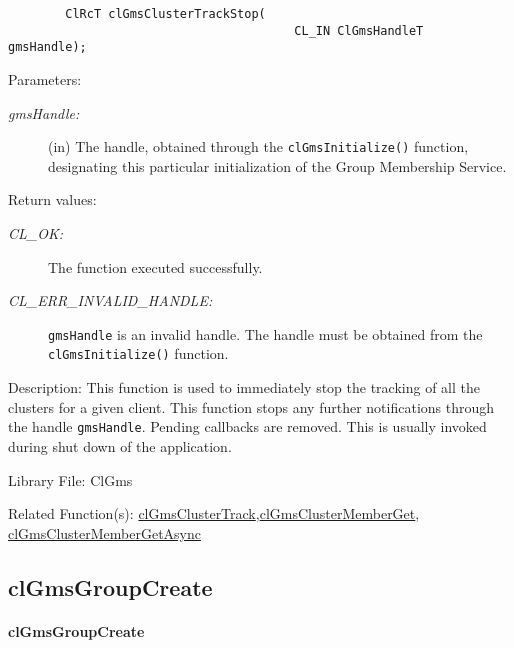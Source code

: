 \begin{flushleft}
\begin{Desc}
\footnotesize\begin{verbatim}        ClRcT clGmsClusterTrackStop(
                                		CL_IN ClGmsHandleT              gmsHandle);
\end{verbatim}
\normalsize
\end{Desc}
\begin{Desc}
\item[Parameters:]
\begin{description}
\item[{\em gms\-Handle:}](in) The handle, obtained through the {\tt{clGmsInitialize()}} function, designating this particular initialization of the
Group Membership Service.\end{description}
\end{Desc}
\begin{Desc}
\item[Return values:]
\begin{description}
\item[{\em CL\_\-OK:}]The function executed successfully. \item[{\em CL\_\-ERR\_\-INVALID\_\-HANDLE:}]{\tt{gmsHandle}} is an invalid handle. The handle
must be obtained from the
{\tt{clGmsInitialize()}} function. \end{description}
\end{Desc}
\begin{Desc}
\item[Description:]This function is used to immediately stop the tracking of all the clusters for a given client. This function stops any further 
notifications through the handle {\tt{gms\-Handle}}. Pending callbacks are removed. This is usually invoked during shut down of the application.\end{Desc}
\begin{Desc}
\item[Library File:]Cl\-Gms\end{Desc}
\begin{Desc}
\item[Related Function(s):]\hyperlink{pagegms103}{cl\-Gms\-Cluster\-Track},\hyperlink{pagegms110}{cl\-Gms\-Cluster\-Member\-Get},
\hyperlink{pagegms111}{cl\-Gms\-Cluster\-Member\-Get\-Async} \end{Desc}
\newpage


\subsection{clGmsGroupCreate}
\hypertarget{pagegms110}{}\paragraph{cl\-Gms\-Group\-Create}\label{pagegms110}


\end{flushleft}
